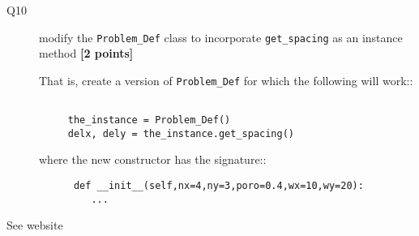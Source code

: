 \documentclass{article}
\newcommand{\ans}[1]{\textcolor{dark-green}{#1}}
\begin{document}
\begin{description}  

  
\item[Q10] modify the \verb+Problem_Def+ class to
  incorporate \verb+get_spacing+ as an instance method \textbf{[2 points]}

  That is, create a version of \verb+Problem_Def+ for which the following will work::

\begin{verbatim}

     the_instance = Problem_Def()
     delx, dely = the_instance.get_spacing()

\end{verbatim}

where the new constructor has the signature::

\begin{verbatim}
      def __init__(self,nx=4,ny=3,poro=0.4,wx=10,wy=20):
         ...
\end{verbatim}

  
\end{description}  

\ans{See website}
\end{document}

